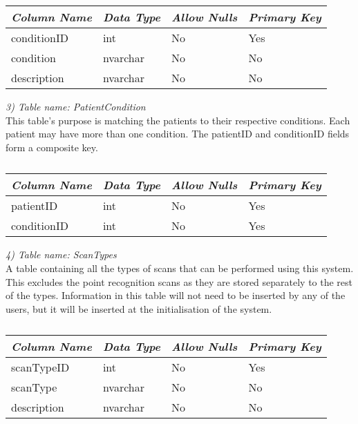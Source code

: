 \begin{table}[ht]
\centering
\begin{tabular}{| l | l | l | l |}
\hline
\emph{\bf{Column Name}} & \emph{\bf{Data Type}} & \emph{\bf{Allow Nulls}} & \emph{\bf{Primary Key}} \\\hline \hline
conditionID & int & No & Yes \\\hline
condition & nvarchar & No & No \\\hline
description & nvarchar & No & No \\\hline
\end{tabular}
\label{table:conditions}
\caption[Database: Conditions]{}
\end{table}

\emph{3) Table name: PatientCondition}\\

This table's purpose is matching the patients to their respective conditions. Each patient may have more than one condition. The patientID and conditionID fields form a composite key.\\

\begin{table}[ht]
\centering
\begin{tabular}{| l | l | l | l |}
\hline
\emph{\bf{Column Name}} & \emph{\bf{Data Type}} & \emph{\bf{Allow Nulls}} & \emph{\bf{Primary Key}} \\\hline \hline
patientID & int & No & Yes \\\hline
conditionID & int & No & Yes \\\hline
\end{tabular}
\label{table:patientCondition}
\caption[Database: PatientCondition]{}
\end{table}

\emph{4) Table name: ScanTypes}\\

A table containing all the types of scans that can be performed using this system. This excludes the point recognition scans as they are stored separately to the rest of the types. Information in this table will not need to be inserted by any of the users, but it will be inserted at the initialisation of the system.\\

\begin{table}[ht]
\centering
\begin{tabular}{| l | l | l | l |}
\hline
\emph{\bf{Column Name}} & \emph{\bf{Data Type}} & \emph{\bf{Allow Nulls}} & \emph{\bf{Primary Key}} \\\hline \hline
scanTypeID & int & No & Yes \\\hline
scanType & nvarchar & No & No \\\hline
description & nvarchar & No & No \\\hline
\end{tabular}
\label{table:scanTypes}
\caption[Database: ScanTypes]{}
\end{table}


